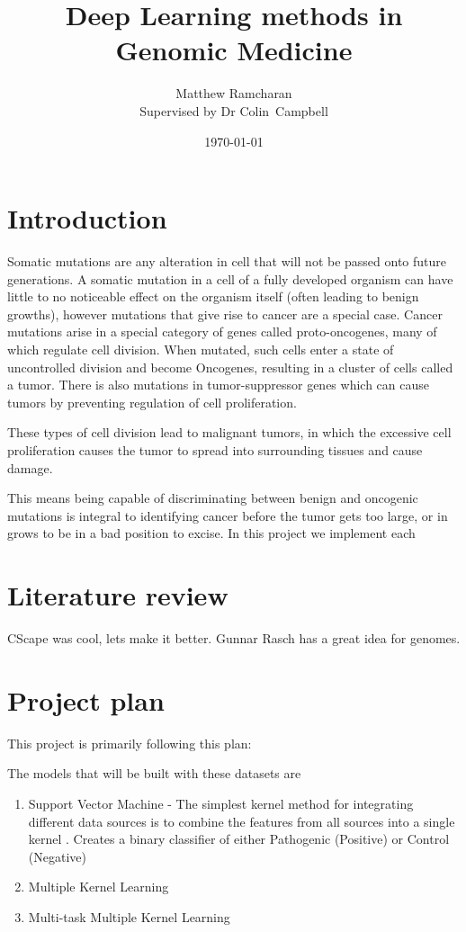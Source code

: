 \documentclass[11pt]{article}
\title{Deep Learning methods in Genomic Medicine}
\author{Matthew Ramcharan \\ Supervised by Dr Colin\ Campbell}
\date{\today}
\begin{document}
\maketitle

\section{Introduction}

Somatic mutations are any alteration in cell that will not be passed onto future generations\cite{Griffiths2000}. A somatic mutation in a cell of a fully developed organism can have little to no noticeable effect on the organism itself (often leading to benign growths), however mutations that give rise to cancer are a special case. Cancer mutations arise in a special category of genes called proto-oncogenes, many of which regulate cell division. When mutated, such cells enter a state of uncontrolled division and become Oncogenes, resulting in a cluster of cells called a tumor.  There is also mutations in tumor-suppressor genes which can cause tumors by preventing regulation of cell proliferation.

These types of cell division lead to malignant tumors, in which the excessive cell proliferation causes the tumor to spread into surrounding tissues and cause damage. 

This means being capable of discriminating between benign and oncogenic mutations is integral to identifying cancer before the tumor gets too large, or in grows to be in a bad position to excise. In this project we implement each 


\section{Literature review}
CScape was cool, lets make it better.
Gunnar Rasch has a great idea for genomes.

\section{Project plan}

This project is primarily following this plan:

The models that will be built with these datasets are
\begin{enumerate}
	\item Support Vector Machine - The simplest kernel method for integrating different data sources is to combine the features from all sources into a single kernel \cite{Rogers2017}. Creates a binary classifier of either Pathogenic (Positive) or Control (Negative)
	\item Multiple Kernel Learning
	\item Multi-task Multiple Kernel Learning
\end{enumerate}
\end{document}
